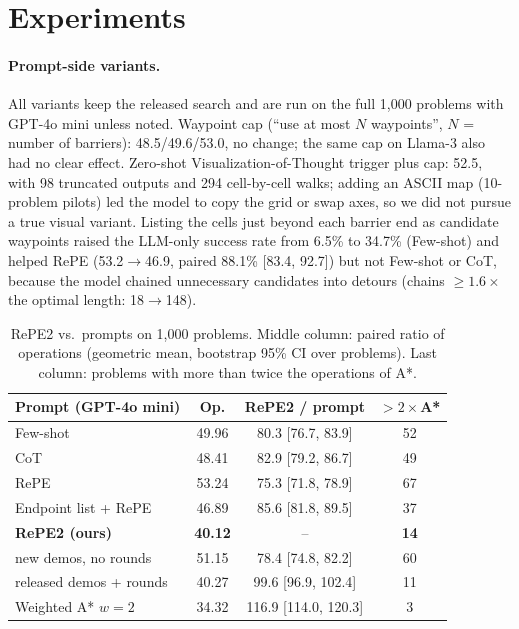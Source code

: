 \documentclass[11pt]{article}
\begin{document}
\section{Experiments}
\label{sec:results}
\paragraph{Prompt-side variants.}
All variants keep the released search and are run on the full 1{,}000 problems with GPT-4o mini unless noted.
Waypoint cap (``use at most $N$ waypoints'', $N$ = number of barriers): 48.5/49.6/53.0, no change; the same cap on Llama-3 also had no clear effect.
Zero-shot Visualization-of-Thought trigger plus cap: 52.5, with 98 truncated outputs and 294 cell-by-cell walks; adding an ASCII map (10-problem pilots) led the model to copy the grid or swap axes, so we did not pursue a true visual variant.
Listing the cells just beyond each barrier end as candidate waypoints raised the LLM-only success rate from 6.5\% to 34.7\% (Few-shot) and helped RePE (53.2$\rightarrow$46.9, paired 88.1\% [83.4, 92.7]) but not Few-shot or CoT, because the model chained unnecessary candidates into detours (chains $\geq1.6\times$ the optimal length: 18$\rightarrow$148).

\begin{table}[t]
\centering\small
\setlength{\tabcolsep}{3pt}
\begin{tabular}{lccc}
\toprule
Prompt (GPT-4o mini) & Op. & RePE2 / prompt & $>2\times$A* \\
\midrule
Few-shot & 49.96 & 80.3 [76.7, 83.9] & 52 \\
CoT & 48.41 & 82.9 [79.2, 86.7] & 49 \\
RePE & 53.24 & 75.3 [71.8, 78.9] & 67 \\
Endpoint list + RePE & 46.89 & 85.6 [81.8, 89.5] & 37 \\
\textbf{RePE2 (ours)} & \textbf{40.12} & -- & \textbf{14} \\
\quad new demos, no rounds & 51.15 & 78.4 [74.8, 82.2] & 60 \\
\quad released demos + rounds & 40.27 & 99.6 [96.9, 102.4] & 11 \\
\midrule
Weighted A* $w{=}2$ & 34.32 & 116.9 [114.0, 120.3] & 3 \\
\bottomrule
\end{tabular}
\caption{RePE2 vs.\ prompts on 1{,}000 problems. Middle column: paired ratio of operations (geometric mean, bootstrap 95\% CI over problems). Last column: problems with more than twice the operations of A*.}
\label{tab:repe2}
\end{table}
\end{document}
